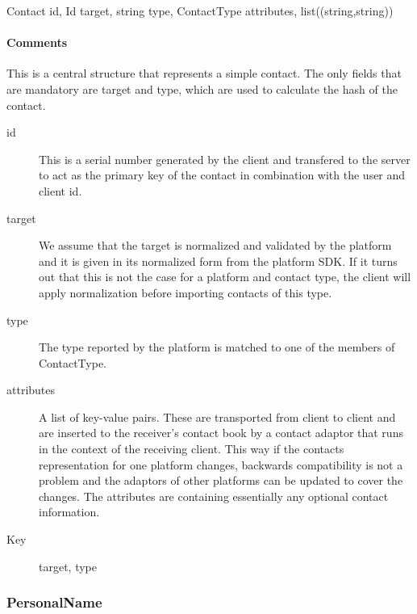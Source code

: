 \documentclass[a4paper,10pt]{article}
\begin{document}
\begin{verbbox}
Contact
{
  id, Id
  target, string
  type, ContactType
  attributes, list((string,string))
}
\end{verbbox}
\begin{center}
\theverbbox
\end{center}

\begin{inparaitem}[ ]
 \item \infrastructure
\end{inparaitem}

\paragraph*{Comments}
This is a central structure that represents a simple contact. The only fields that are mandatory are target and type, which are used to calculate the hash of the contact.

\SpecialItem
\begin{description}
 \item[id] This is a serial number generated by the client and transfered to the server to act as the primary key of the contact in combination with the user and client id.
 \item[target] We assume that the target is normalized and validated by the platform and it is given in its normalized form from the platform SDK. If it turns out that this is not 
the case for a platform and contact type, the client will apply normalization before importing contacts of this type.
 \item[type] The type reported by the platform is matched to one of the members of ContactType.
 \item[attributes] A list of key-value pairs. These are transported from client to client and are inserted to the receiver's contact book by a contact adaptor that runs in the 
context of the receiving client. This way if the contacts representation for one platform changes, backwards compatibility is not a problem and the adaptors of other platforms can 
be updated to cover the changes. The attributes are containing essentially any optional contact information.
\end{description}

\SpecialItem
\begin{description}
 \item[Key] target, type
\end{description}

\subsubsection{PersonalName}
\end{document}
